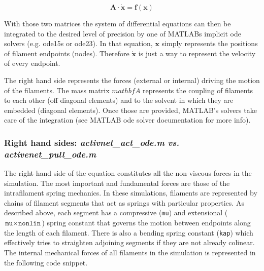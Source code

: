 \begin{equation}
\mathbf{A \cdot \dot x} = \mathbf{f(x)}
\end{equation}

With those two matrices the system of differential equations can then be integrated to the desired level of precision by one of MATLABs implicit ode solvers (e.g. ode15s or ode23).  In that equation, $\mathbf{x}$ simply represents the positions of filament endpoints (nodes).  Therefore $\mathbf{\dot{x}}$ is just a way to represent the velocity of every endpoint.  

The right hand side represents the forces (external or internal) driving the motion of the filaments.  The mass matrix $mathbf{A}$ represents the coupling of filaments to each other (off diagonal elements) and to the solvent in which they are embedded (diagonal elements).  Once those are provided, MATLAB's solvers take care of the integration (see MATLAB ode solver documentation for more info).


\subsubsection{Right hand sides: \textit{activnet\_act\_ode.m vs. activenet\_pull\_ode.m}}

The right hand side of the equation constitutes all the non-viscous forces in the simulation.  The most important and fundamental forces are those of the intrafilament spring mechanics.  In these simulations, filaments are represented by chains of filament segments that act as springs with particular properties.  As described above, each segment has a compressive (\texttt{mu}) and extensional ($\texttt{mu}\times\texttt{nonlin}$) spring constant that governs the motion between endpoints along the length of each filament.  There is also a bending spring constant (\texttt{kap}) which effectively tries to straighten adjoining segments if they are not already colinear.  The internal mechanical forces of all filaments in the simulation is represented in the following code snippet.

